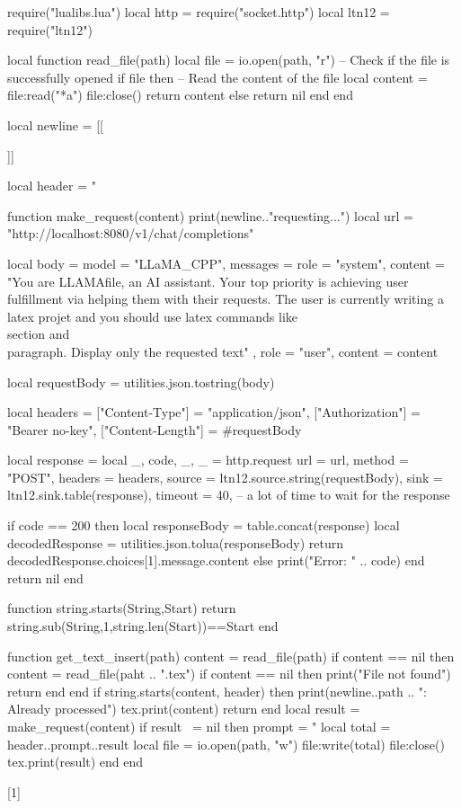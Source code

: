 

\usepackage{luacode}


\begin{luacode}
require("lualibs.lua")
local http = require("socket.http")
local ltn12 = require("ltn12")

local function read_file(path)
    local file = io.open(path, "r")
    -- Check if the file is successfully opened
    if file then
        -- Read the content of the file
        local content = file:read("*a")
        file:close()
        return content
    else
        return nil
    end
end

local newline = [[

]]

local header = "%




function make_request(content)
  print(newline.."requesting...")
  local url = "http://localhost:8080/v1/chat/completions"

  local body = {
    model = "LLaMA_CPP",
    messages = {
      { role = "system", content = "You are LLAMAfile, an AI assistant. Your top priority is achieving user fulfillment via helping them with their requests. The user is currently writing a latex projet and you should use latex commands like \\section and \\paragraph. Display only the requested text" },
      { role = "user",   content = content }
    }
  }

  local requestBody = utilities.json.tostring(body)

  local headers = {
    ["Content-Type"] = "application/json",
    ["Authorization"] = "Bearer no-key",
    ["Content-Length"] = #requestBody
  }

  local response = {}
  local _, code, _, _ = http.request {
    url = url,
    method = "POST",
    headers = headers,
    source = ltn12.source.string(requestBody),
    sink = ltn12.sink.table(response),
    timeout = 40, -- a lot of time to wait for the response
  }

  if code == 200 then
    local responseBody = table.concat(response)
    local decodedResponse = utilities.json.tolua(responseBody)
    return decodedResponse.choices[1].message.content
  else
    print("Error: " .. code)
  end
  return nil
end

function string.starts(String,Start)
  return string.sub(String,1,string.len(Start))==Start
end


function get_text_insert(path)
  content = read_file(path)
  if content == nil then
    content = read_file(paht .. ".tex")
    if content == nil then
      print("File not found")
      return
    end
  end
  if string.starts(content, header) then
    print(newline..path .. ": Already processed")
    tex.print(content)
    return
  end
  local result = make_request(content)
  if result ~= nil then
      prompt = "%
      local total = header..prompt..result
      local file = io.open(path, "w")
      file:write(total)
      file:close()
      tex.print(result)
    end
end
\end{luacode}

\let\originalinput

\renewcommand{}[1]{%
}

